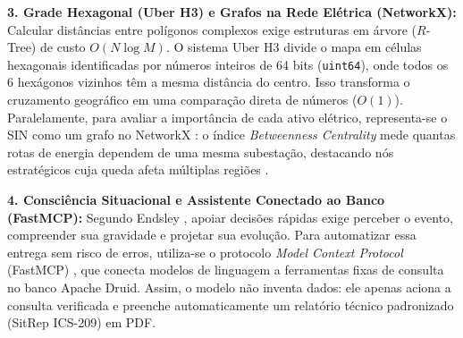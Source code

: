 \textbf{3. Grade Hexagonal (Uber H3) e Grafos na Rede Elétrica (NetworkX):} Calcular distâncias entre polígonos complexos exige estruturas em árvore ($R$-Tree) de custo $O(N \log M)$. O sistema Uber H3 \cite{uber_h3_2018} divide o mapa em células hexagonais identificadas por números inteiros de 64 bits (\texttt{uint64}), onde todos os 6 hexágonos vizinhos têm a mesma distância do centro. Isso transforma o cruzamento geográfico em uma comparação direta de números ($O(1)$). Paralelamente, para avaliar a importância de cada ativo elétrico, representa-se o SIN como um grafo no NetworkX \cite{hagberg2008exploring}: o índice \textit{Betweenness Centrality} mede quantas rotas de energia dependem de uma mesma subestação, destacando nós estratégicos cuja queda afeta múltiplas regiões \cite{ons2026dadosabertos}.

\textbf{4. Consciência Situacional e Assistente Conectado ao Banco (FastMCP):} Segundo Endsley \cite{endsley1995toward}, apoiar decisões rápidas exige perceber o evento, compreender sua gravidade e projetar sua evolução. Para automatizar essa entrega sem risco de erros, utiliza-se o protocolo \textit{Model Context Protocol} (FastMCP) \cite{anthropic2024mcp}, que conecta modelos de linguagem a ferramentas fixas de consulta no banco Apache Druid. Assim, o modelo não inventa dados: ele apenas aciona a consulta verificada e preenche automaticamente um relatório técnico padronizado (SitRep ICS-209) em PDF.
